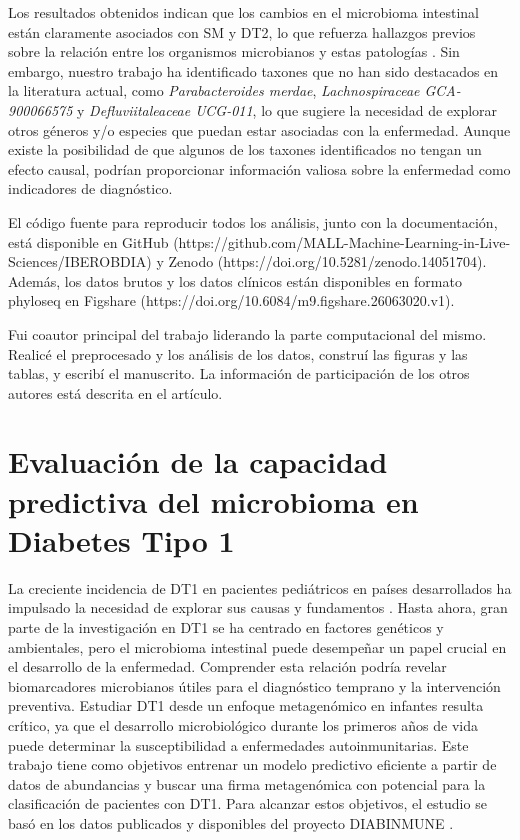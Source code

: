 Los resultados obtenidos indican que los cambios en el microbioma intestinal están claramente asociados con SM y DT2, lo que refuerza hallazgos previos sobre la relación entre los organismos microbianos y estas patologías \cite{valdes2018role, lynch2016human, gurung2020role}. Sin embargo, nuestro trabajo ha identificado taxones que no han sido destacados en la literatura actual, como \textit{Parabacteroides merdae}, \textit{Lachnospiraceae GCA-900066575} y \textit{Defluviitaleaceae UCG-011}, lo que sugiere la necesidad de explorar otros géneros y/o especies que puedan estar asociadas con la enfermedad. Aunque existe la posibilidad de que algunos de los taxones identificados no tengan un efecto causal, podrían proporcionar información valiosa sobre la enfermedad como indicadores de diagnóstico.

El código fuente para reproducir todos los análisis, junto con la documentación, está disponible en GitHub (https://github.com/MALL-Machine-Learning-in-Live-Sciences/IBEROBDIA) y Zenodo (https://doi.org/10.5281/zenodo.14051704). Además, los datos brutos y los datos clínicos están disponibles en formato phyloseq en Figshare (https://doi.org/10.6084/m9.figshare.26063020.v1).

Fui coautor principal del trabajo liderando la parte computacional del mismo. Realicé el preprocesado y los análisis de los datos, construí las figuras y las tablas, y escribí el manuscrito. La información de participación de los otros autores está descrita en el artículo.



\section{Evaluación de la capacidad predictiva del microbioma en Diabetes Tipo 1}


La creciente incidencia de DT1 en pacientes pediátricos en países desarrollados ha impulsado la necesidad de explorar sus causas y fundamentos \cite{mayer2017incidence, manuwald2021trends}. Hasta ahora, gran parte de la investigación en DT1 se ha centrado en factores genéticos y ambientales, pero el microbioma intestinal puede desempeñar un papel crucial en el desarrollo de la enfermedad. Comprender esta relación podría revelar biomarcadores microbianos útiles para el diagnóstico temprano y la intervención preventiva. Estudiar DT1 desde un enfoque metagenómico en infantes resulta crítico, ya que el desarrollo microbiológico durante los primeros años de vida puede determinar la susceptibilidad a enfermedades autoinmunitarias. Este trabajo tiene como objetivos entrenar un modelo predictivo eficiente a partir de datos de abundancias y buscar una firma metagenómica con potencial para la clasificación de pacientes con DT1. Para alcanzar estos objetivos, el estudio se basó en los datos publicados y disponibles del proyecto DIABINMUNE \cite{diabimmune}.


